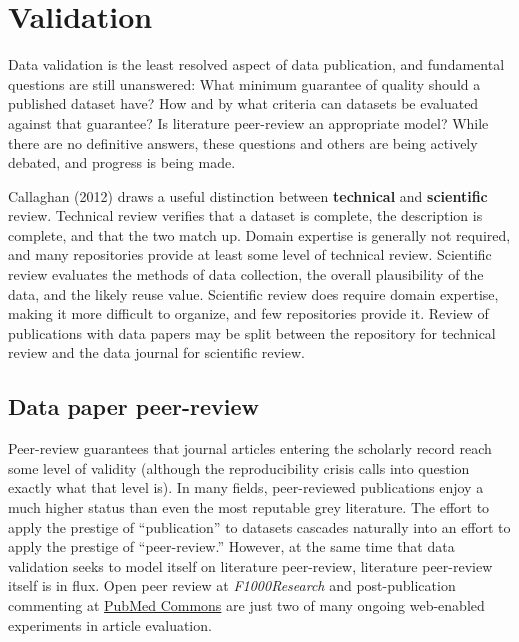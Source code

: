 \documentclass[10pt,twocolumn]{article}
\begin{document}
\section*{Validation}\label{validation}

Data validation is the least resolved aspect of data publication, and fundamental questions are still unanswered:
What minimum guarantee of quality should a published dataset have? 
How and by what criteria can datasets be evaluated against that guarantee?
Is literature peer-review an appropriate model?
While there are no definitive answers, these questions and others are being actively debated, and progress is being made.

Callaghan (2012)\cite{sarah_callaghan_making_2012} draws a useful distinction between \textbf{technical} and \textbf{scientific} review.
Technical review verifies that a dataset is complete, the description is complete, and that the two match up.
Domain expertise is generally not required, and many repositories provide at least some level of technical review.
Scientific review evaluates the methods of data collection, the overall plausibility of the data, and the likely reuse value.
Scientific review does require domain expertise, making it more difficult to organize, and few repositories provide it.
Review of publications with data papers may be split between the repository for technical review and the data journal for scientific review. 


\subsection*{Data paper peer-review}\label{data-paper-peer-review}

Peer-review guarantees that journal articles entering the scholarly record reach some level of validity (although the reproducibility crisis calls into question exactly what that level is).
In many fields, peer-reviewed publications enjoy a much higher status than even the most reputable grey literature.
The effort to apply the prestige of ``publication'' to datasets cascades naturally into an effort to apply the prestige of ``peer-review.''
However, at the same time that data validation seeks to model itself on literature peer-review, literature peer-review itself is in flux.
Open peer review at \emph{F1000Research} and post-publication commenting at \href{http://www.ncbi.nlm.nih.gov/pubmedcommons/}{PubMed Commons} are just two of many ongoing web-enabled experiments in article evaluation.
\end{document}
